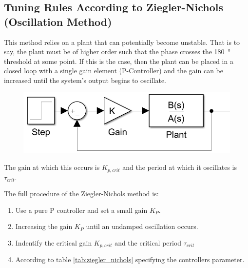 \subsection{Tuning Rules According to Ziegler-Nichols (Oscillation Method)}

This method relies on a plant that can potentially become unstable. That is to
say,  the  plant  must be of higher order such  that  the  phase  crosses  the
\SI{180}{\degree} threshold at some point. If this is the case, then the plant
can be  placed  in a closed loop with a single gain element (P-Controller) and
the gain can be  increased  until  the  system's  output  begins to oscillate.

\begin{figure}[H]
    \centering
    \includegraphics[width=\imagewidth]{images/osc_method.png}
\end{figure}

The gain at which this occurs  is  $K_{p,crit}$  and  the  period  at which it
oscillates is $\tau_{crit}$.

The full procedure of the Ziegler-Nichols method is:

\begin{enumerate}
    \item Use a pure P controller and set a small gain $K_{P}$.
    \item Increasing the gain $K_{P}$ until an undamped oscillation occurs.
    \item Indentify the critical gain $K_{p,crit}$ and the critical period $\tau_{crit}$
    \item According to table \ref{tab:ziegler_nichols} specifying the controllers parameter.
\end{enumerate}

